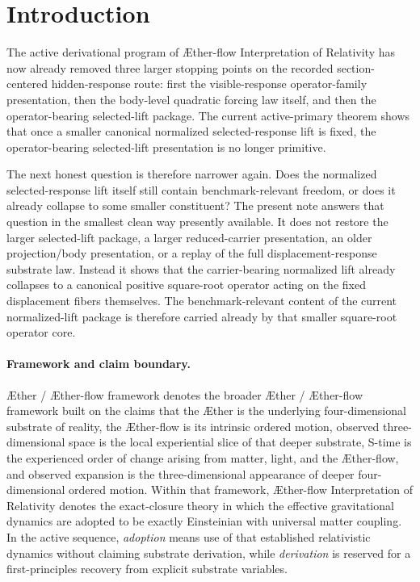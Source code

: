 \documentclass[11pt]{article}
\newcommand{\Aether}{\AE{}ther}
\newcommand{\Aflow}{\AE{}ther-flow}
\newcommand{\TheoryName}{\Aflow{} Interpretation of Relativity}
\newcommand{\TheoryProgram}{\Aether{} / \Aflow{} framework}
\begin{document}
\section{Introduction}

The active derivational program of \TheoryName{} has now already removed three larger stopping points on the recorded section-centered hidden-response route: first the visible-response operator-family presentation, then the body-level quadratic forcing law itself, and then the operator-bearing selected-lift package. The current active-primary theorem shows that once a smaller canonical normalized selected-response lift is fixed, the operator-bearing selected-lift presentation is no longer primitive.

The next honest question is therefore narrower again. Does the normalized selected-response lift itself still contain benchmark-relevant freedom, or does it already collapse to some smaller constituent? The present note answers that question in the smallest clean way presently available. It does not restore the larger selected-lift package, a larger reduced-carrier presentation, an older projection/body presentation, or a replay of the full displacement-response substrate law. Instead it shows that the carrier-bearing normalized lift already collapses to a canonical positive square-root operator acting on the fixed displacement fibers themselves. The benchmark-relevant content of the current normalized-lift package is therefore carried already by that smaller square-root operator core.

\paragraph{Framework and claim boundary.}
\TheoryProgram{} denotes the broader \Aether{} / \Aflow{} framework built on the claims that the \Aether{} is the underlying four-dimensional substrate of reality, the \Aflow{} is its intrinsic ordered motion, observed three-dimensional space is the local experiential slice of that deeper substrate, S-time is the experienced order of change arising from matter, light, and the \Aflow{}, and observed expansion is the three-dimensional appearance of deeper four-dimensional ordered motion. Within that framework, \TheoryName{} denotes the exact-closure theory in which the effective gravitational dynamics are adopted to be exactly Einsteinian with universal matter coupling. In the active sequence, \emph{adoption} means use of that established relativistic dynamics without claiming substrate derivation, while \emph{derivation} is reserved for a first-principles recovery from explicit substrate variables.
\end{document}
